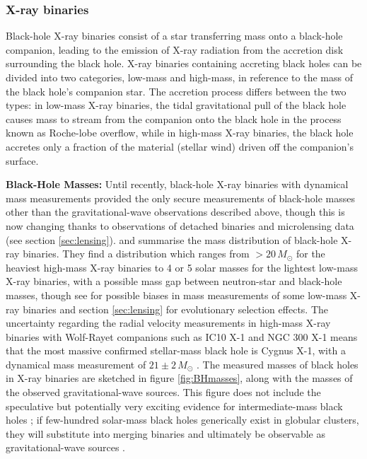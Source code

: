 \documentclass[review]{elsarticle}
\begin{document}
\subsubsection{X-ray binaries}\label{sec:XRB}

Black-hole X-ray binaries consist of a star transferring mass onto a black-hole companion, leading to the emission of X-ray radiation from the accretion disk surrounding the black hole.  X-ray binaries containing accreting black holes can be divided into two categories, low-mass and high-mass, in reference to the mass of the black hole's companion star. The accretion process differs between the two types: in low-mass X-ray binaries, the tidal gravitational pull of the black hole causes mass to stream from the companion onto the black hole in the process known as Roche-lobe overflow, while in high-mass X-ray binaries, the black hole accretes only a fraction of the material (stellar wind) driven off the companion's surface.

\textbf{Black-Hole Masses:} 
Until recently, black-hole X-ray binaries with dynamical mass measurements provided the only secure measurements of black-hole masses other than the gravitational-wave observations described above, though this is now changing thanks to observations of detached binaries and microlensing data (see section \ref{sec:lensing}).  \citet{Ozel:2010} and \citet{Farr:2011} summarise the mass distribution of black-hole X-ray binaries.  They find a distribution which ranges from $> 20\, M_\odot$ for the heaviest high-mass X-ray binaries to 4 or 5 solar masses for the lightest low-mass X-ray binaries, with a possible mass gap between neutron-star and black-hole masses, though see \cite{Kreidberg:2012} for possible biases in mass measurements of some low-mass X-ray binaries and section \ref{sec:lensing} for evolutionary selection effects.  The uncertainty regarding the radial velocity measurements in high-mass X-ray binaries with Wolf-Rayet companions such as IC10 X-1 and NGC 300 X-1 \citep{Laycock:2015} means that the most massive confirmed stellar-mass black hole is Cygnus X-1, with a dynamical mass measurement of $21 \pm 2\, M_\odot$ \citep{MillerJones:2021}.   The measured masses of black holes in X-ray binaries are sketched in figure \ref{fig:BHmasses}, along with the masses of the observed gravitational-wave sources.  This figure does not include the speculative but potentially very exciting evidence for intermediate-mass black holes \citep{MillerColbert:2004,Greene:2019,Paynter:2021}; if few-hundred solar-mass black holes generically exist in globular clusters, they will substitute into merging binaries and ultimately be observable as gravitational-wave sources \citep[e.g.,][]{Mandel:2008,IMBBH:O1}.
\end{document}
